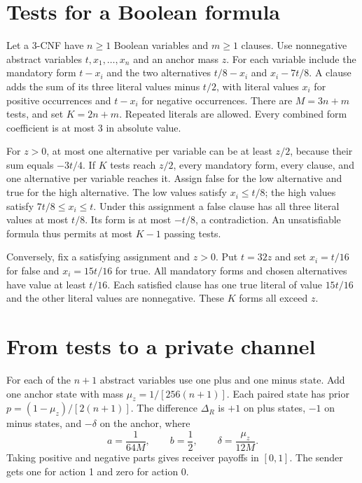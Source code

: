 \documentclass[11pt,a4paper]{amsart}
\begin{document}
\section{Tests for a Boolean formula}

Let a 3-CNF have \(n\geq1\) Boolean variables and \(m\geq1\) clauses.
Use nonnegative abstract variables \(t,x_1,\ldots,x_n\) and an anchor
mass \(z\). For each variable include the mandatory form \(t-x_i\)
and the two alternatives \(t/8-x_i\) and \(x_i-7t/8\).
A clause adds the sum of its three literal values minus \(t/2\), with
literal values \(x_i\) for positive occurrences and \(t-x_i\) for
negative occurrences. There are \(M=3n+m\) tests, and set \(K=2n+m\).
Repeated literals are allowed. Every combined form coefficient is
at most 3 in absolute value.

For \(z>0\), at most one alternative per variable can be at least
\(z/2\), because their sum equals \(-3t/4\). If \(K\) tests reach
\(z/2\), every mandatory form, every clause, and one alternative per
variable reaches it. Assign false for the low alternative and true
for the high alternative. The low values satisfy \(x_i\leq t/8\);
the high values satisfy \(7t/8\leq x_i\leq t\).
Under this assignment a false clause has all three literal values at
most \(t/8\). Its form is at most \(-t/8\), a contradiction.
An unsatisfiable formula thus permits at most \(K-1\) passing tests.

Conversely, fix a satisfying assignment and \(z>0\). Put \(t=32z\)
and set \(x_i=t/16\) for false and \(x_i=15t/16\) for true.
All mandatory forms and chosen alternatives have value at least \(t/16\).
Each satisfied clause has one true literal of value \(15t/16\) and
the other literal values are nonnegative. These \(K\) forms all exceed \(z\).

\section{From tests to a private channel}

For each of the \(n+1\) abstract variables use one plus and one minus
state. Add one anchor state with mass
\(\mu_z=1/[256(n+1)]\). Each paired state has prior
\(p=(1-\mu_z)/[2(n+1)]\).
The difference \(\Delta_R\) is \(+1\) on plus states, \(-1\) on
minus states, and \(-\delta\) on the anchor, where
\[
 a=\frac{1}{64M},\qquad b=\frac12,\qquad
 \delta=\frac{\mu_z}{12M}.
\]
Taking positive and negative parts gives receiver payoffs in
\([0,1]\). The sender gets one for action 1 and zero for action 0.
\end{document}
